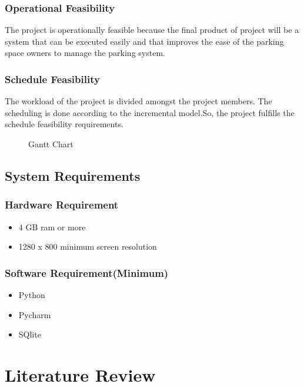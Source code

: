 \subsection{Operational Feasibility}
The project is operationally feasible because the final product of project will be a system that can be executed easily and that improves the ease of the parking space owners to manage the parking system.
\subsection{Schedule Feasibility}
The workload of the project is divided amongst the project members. The scheduling is done according to the incremental model.So, the project fulfills the schedule feasibility requirements.
\begin{figure}[h!]
    \caption{Gantt Chart}
    \label{fig:my_label}
\end{figure}
\section{System Requirements}
\subsection{Hardware Requirement}
\begin{itemize}
    \item 4 GB ram or more
    \item 1280 x 800 minimum screen resolution
    
\end{itemize}

\subsection{Software Requirement(Minimum)}
\begin{itemize}
    \item Python
    \item Pycharm
    \item SQlite
\end{itemize}





\chapter{Literature Review}
